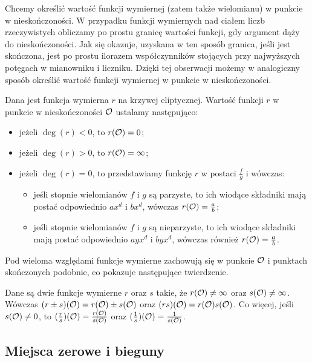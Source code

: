 Chcemy określić wartość funkcji wymiernej (zatem także wielomianu)
w punkcie w nieskończoności.
W przypadku funkcji wymiernych nad ciałem liczb rzeczywistych
obliczamy po prostu granicę wartości funkcji,
gdy argument dąży do nieskończoności.
Jak się okazuje, uzyskana w ten sposób granica, jeśli jest skończona,
jest po prostu ilorazem współczynników stojących przy najwyższych potęgach
w mianowniku i liczniku.
Dzięki tej obserwacji możemy w analogiczny sposób określić
wartość funkcji wymiernej w punkcie w nieskończoności.

\begin{definition}
Dana jest funkcja wymierna $r$ na krzywej eliptycznej.
Wartość funkcji $r$ w punkcie w nieskończoności $\mathcal{O}$
ustalamy następująco:
\begin{itemize}
\item jeżeli $\deg(r) < 0$, to $r(\mathcal{O}) = 0$;
\item jeżeli $\deg(r) > 0$, to $r(\mathcal{O}) = \infty$;
\item jeżeli $\deg(r) = 0$,
to przedstawiamy funkcję $r$ w postaci $\frac{f}{g}$ i wówczas:
\begin{itemize}
\item jeśli stopnie wielomianów $f$ i $g$ są parzyste,
to ich wiodące składniki mają postać odpowiednio $ax^d$ i $bx^d$,
wówczas $r(\mathcal{O}) = \frac{a}{b}$;
\item jeśli stopnie wielomianów $f$ i $g$ są nieparzyste,
to ich wiodące składniki mają postać odpowiednio $ayx^d$ i $byx^d$,
wówczas również $r(\mathcal{O}) = \frac{a}{b}$.
\end{itemize}
\end{itemize}
\end{definition}

Pod wieloma względami funkcje wymierne zachowują się
w punkcie $\mathcal{O}$ i punktach skończonych podobnie,
co pokazuje następujące twierdzenie.

\begin{theorem}
Dane są dwie funkcje wymierne $r$ oraz $s$ takie,
że $r(\mathcal{O}) \neq \infty$ oraz $s(\mathcal{O}) \neq \infty$.
Wówczas $(r \pm s)(\mathcal{O}) = r(\mathcal{O}) \pm s(\mathcal{O})$
oraz $(rs)(\mathcal{O}) = r(\mathcal{O})s(\mathcal{O})$.
Co więcej, jeśli $s(\mathcal{O}) \neq 0$,
to $(\frac{r}{s})(\mathcal{O}) = \frac{r(\mathcal{O})}{s(\mathcal{O})}$
oraz $(\frac{1}{s})(\mathcal{O}) = \frac{1}{s(\mathcal{O})}$.
\end{theorem}

\subsection*{Miejsca zerowe i bieguny}

